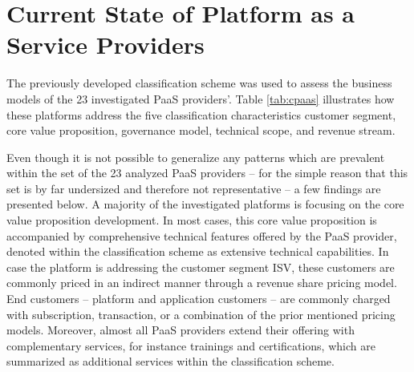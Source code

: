 \section{Current State of Platform as a Service Providers}\label{ch:sota:cPaaS}

The previously developed classification scheme was used to assess the business models of the 23 investigated \ac{PaaS} providers'. Table \ref{tab:cpaas} illustrates how these platforms address the five classification characteristics customer segment, core value proposition, governance model, technical scope, and revenue stream. 

Even though it is not possible to generalize any patterns which are prevalent within the set of the 23 analyzed \ac{PaaS} providers -- for the simple reason that this set is by far undersized and therefore not representative -- a few findings are presented below. A majority of the investigated platforms is focusing on the core value proposition development. In most cases, this core value proposition is accompanied by comprehensive technical features offered by the \ac{PaaS} provider, denoted within the classification scheme as extensive technical capabilities. In case the platform is addressing the customer segment \ac{ISV}, these customers are commonly priced in an indirect manner through a revenue share pricing model. End customers -- platform and application customers -- are commonly charged with subscription, transaction, or a combination of the prior mentioned pricing models. Moreover, almost all \ac{PaaS} providers extend their offering with complementary services, for instance trainings and certifications, which are summarized as additional services within the classification scheme.

